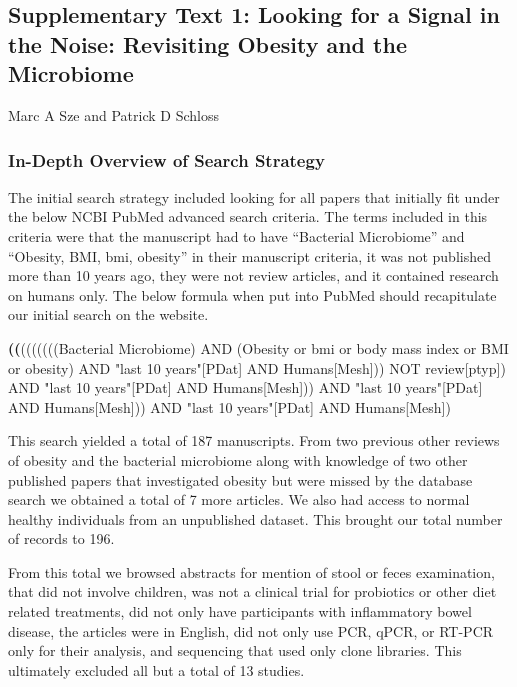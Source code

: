 \documentclass[12pt,]{article}
\title{}
\author{}
\date{}
\newenvironment{Shaded}{\begin{snugshade}}{\end{snugshade}}
\newcommand{\KeywordTok}[1]{\textcolor[rgb]{0.13,0.29,0.53}{\textbf{{#1}}}}
\newcommand{\StringTok}[1]{\textcolor[rgb]{0.31,0.60,0.02}{{#1}}}
\newcommand{\NormalTok}[1]{{#1}}
\begin{document}
\subsection{Supplementary Text 1: Looking for a Signal in the Noise:
Revisiting Obesity and the
Microbiome}\label{supplementary-text-1-looking-for-a-signal-in-the-noise-revisiting-obesity-and-the-microbiome}

Marc A Sze and Patrick D Schloss

\subsubsection{In-Depth Overview of Search
Strategy}\label{in-depth-overview-of-search-strategy}

The initial search strategy included looking for all papers that
initially fit under the below NCBI PubMed advanced search criteria. The
terms included in this criteria were that the manuscript had to have
``Bacterial Microbiome'' and ``Obesity, BMI, bmi, obesity'' in their
manuscript criteria, it was not published more than 10 years ago, they
were not review articles, and it contained research on humans only. The
below formula when put into PubMed should recapitulate our initial
search on the website.

\begin{Shaded}
\begin{Highlighting}[]
\KeywordTok{((}\NormalTok{(((((((Bacterial Microbiome) AND (Obesity or bmi or body mass index or BMI or obesity) AND }\StringTok{"last 10 years"}\NormalTok{[PDat] AND Humans[Mesh])) NOT review[ptyp]) AND }\StringTok{"last 10 years"}\NormalTok{[PDat] AND Humans[Mesh])) AND }\StringTok{"last 10 years"}\NormalTok{[PDat] AND Humans[Mesh])) AND }\StringTok{"last 10 years"}\NormalTok{[PDat] AND Humans[Mesh])}
\end{Highlighting}
\end{Shaded}

This search yielded a total of 187 manuscripts. From two previous other
reviews of obesity and the bacterial microbiome along with knowledge of
two other published papers that investigated obesity but were missed by
the database search we obtained a total of 7 more articles. We also had
access to normal healthy individuals from an unpublished dataset. This
brought our total number of records to 196.

From this total we browsed abstracts for mention of stool or feces
examination, that did not involve children, was not a clinical trial for
probiotics or other diet related treatments, did not only have
participants with inflammatory bowel disease, the articles were in
English, did not only use PCR, qPCR, or RT-PCR only for their analysis,
and sequencing that used only clone libraries. This ultimately excluded
all but a total of 13 studies.
\end{document}
